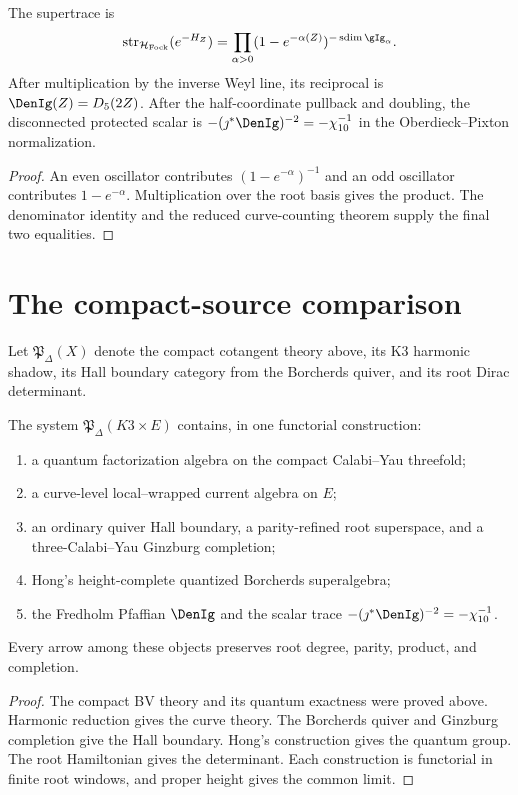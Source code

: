 \begin{theorem}
The supertrace is
\[
 \str_{\mathcal H_{\mathrm{Fock}}}(e^{-H_Z})
 =\prod_{\alpha>0}
 (1-e^{-\alpha(Z)})^{-\sdim\gIg_\alpha}.
\]
After multiplication by the inverse Weyl line, its reciprocal is $\DenIg(Z)=D_5(2Z)$.  After the half-coordinate pullback and doubling, the disconnected protected scalar is $-(\jmath^*\DenIg)^{-2}=-\chi_{10}^{-1}$ in the Oberdieck--Pixton normalization.
\end{theorem}
\begin{proof}
An even oscillator contributes $(1-e^{-\alpha})^{-1}$ and an odd oscillator contributes $1-e^{-\alpha}$.  Multiplication over the root basis gives the product.  The denominator identity and the reduced curve-counting theorem supply the final two equalities.
\end{proof}

\chapter{The compact-source comparison}
Let $\mathfrak P_\Delta(X)$ denote the compact cotangent theory above, its K3 harmonic shadow, its Hall boundary category from the Borcherds quiver, and its root Dirac determinant.

\begin{theorem}
The system $\mathfrak P_\Delta(K3\times E)$ contains, in one functorial construction:
\begin{enumerate}
\item a quantum factorization algebra on the compact Calabi--Yau threefold;
\item a curve-level local--wrapped current algebra on $E$;
\item an ordinary quiver Hall boundary, a parity-refined root superspace, and a three-Calabi--Yau Ginzburg completion;
\item Hong's height-complete quantized Borcherds superalgebra;
\item the Fredholm Pfaffian $\DenIg$ and the scalar trace $-(\jmath^*\DenIg)^{-2}=-\chi_{10}^{-1}$.
\end{enumerate}
Every arrow among these objects preserves root degree, parity, product, and completion.
\end{theorem}
\begin{proof}
The compact BV theory and its quantum exactness were proved above.  Harmonic reduction gives the curve theory.  The Borcherds quiver and Ginzburg completion give the Hall boundary.  Hong's construction gives the quantum group.  The root Hamiltonian gives the determinant.  Each construction is functorial in finite root windows, and proper height gives the common limit.
\end{proof}

